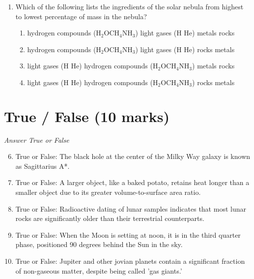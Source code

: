 \documentclass[12pt]{article}
\begin{document}
\begin{enumerate}[label=\arabic*.]
\begin{enumerate}[label=(\alph*)]
    \item fast rotation only
    \item a rocky mantle only
    \item a molten metallic core only
    \item both a molten metallic core and reasonably fast rotation
\end{enumerate}
\item Which of the following lists the ingredients of the solar nebula from highest to lowest percentage of mass in the nebula?
\begin{enumerate}[label=(\alph*)]
    \item hydrogen compounds (H$_{2}$OCH$_{4}$NH$_{3}$) light gases (H He) metals rocks
    \item hydrogen compounds (H$_{2}$OCH$_{4}$NH$_{3}$) light gases (H He) rocks metals
    \item light gases (H He) hydrogen compounds (H$_{2}$OCH$_{4}$NH$_{3}$) metals rocks
    \item light gases (H He) hydrogen compounds (H$_{2}$OCH$_{4}$NH$_{3}$) rocks metals
\end{enumerate}
\end{enumerate}

\section*{True / False (10 marks)}
\textit{Answer True or False}
\begin{enumerate}[label=\arabic*.]
\setcounter{enumi}{5}
\item True or False: The black hole at the center of the Milky Way galaxy is known as Sagittarius A*.
\item True or False: A larger object, like a baked potato, retains heat longer than a smaller object due to its greater volume-to-surface area ratio.
\item True or False: Radioactive dating of lunar samples indicates that most lunar rocks are significantly older than their terrestrial counterparts.
\item True or False: When the Moon is setting at noon, it is in the third quarter phase, positioned 90 degrees behind the Sun in the sky.
\item True or False: Jupiter and other jovian planets contain a significant fraction of non-gaseous matter, despite being called 'gas giants.'
\end{enumerate}
\end{document}
